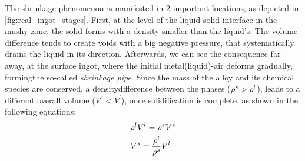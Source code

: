 The shrinkage phenomenon is manifested in 2 important locations, as depicted in \autoref{fig:real_ingot_stages}. 
First, at the level of the liquid-solid interface in the mushy zone, the solid forms with a density smaller than 
the liquid's. The volume difference tends to create voids with a big negative pressure, that systematically drains 
the liquid in its direction. Afterwards, we can see the consequence far away, at the surface ingot, where the initial 
metal(liquid)-air deforms gradually, formingthe so-called \emph{shrinkage pipe}. Since the mass of the alloy and its 
chemical species are conserved, a densitydifference between the phases ($\rho^s > \rho^l$), leads to a different overall 
volume ($V^s<V^l$), once solidification is complete, as shown in the following equations:
\begin{subequations}
\begin{align}
& \rho^l V^l = \rho^s V^s  \\ 
& V^s = \frac{\rho^l}{\rho^s} V^l
\end{align}
\end{subequations}
%
%
%
%
%
% 

